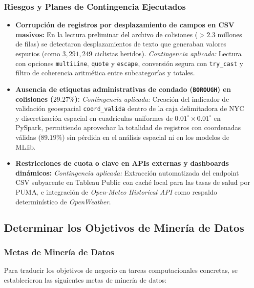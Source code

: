 \subsubsection{Riesgos y Planes de Contingencia Ejecutados}
\begin{itemize}
    \item \textbf{Corrupción de registros por desplazamiento de campos en CSV masivos:} En la lectura preliminar del archivo de colisiones ($>2.3$ millones de filas) se detectaron desplazamientos de texto que generaban valores espurios (como $3,291,249$ ciclistas heridos). \textit{Contingencia aplicada:} Lectura con opciones \texttt{multiLine}, \texttt{quote} y \texttt{escape}, conversión segura con \texttt{try\_cast} y filtro de coherencia aritmética entre subcategorías y totales.
    \item \textbf{Ausencia de etiquetas administrativas de condado (\texttt{BOROUGH}) en colisiones ($29.27\%$):} \textit{Contingencia aplicada:} Creación del indicador de validación geoespacial \texttt{coord\_valida} dentro de la caja delimitadora de NYC y discretización espacial en cuadrículas uniformes de $0.01^\circ \times 0.01^\circ$ en PySpark, permitiendo aprovechar la totalidad de registros con coordenadas válidas ($89.19\%$) sin pérdida en el análisis espacial ni en los modelos de MLlib.
    \item \textbf{Restricciones de cuota o clave en APIs externas y dashboards dinámicos:} \textit{Contingencia aplicada:} Extracción automatizada del endpoint CSV subyacente en Tableau Public con caché local para las tasas de salud por PUMA, e integración de \textit{Open-Meteo Historical API} como respaldo determinístico de \textit{OpenWeather}.
\end{itemize}

\subsection{Determinar los Objetivos de Minería de Datos}

\subsubsection{Metas de Minería de Datos}

Para traducir los objetivos de negocio en tareas computacionales concretas, se establecieron las siguientes metas de minería de datos:

